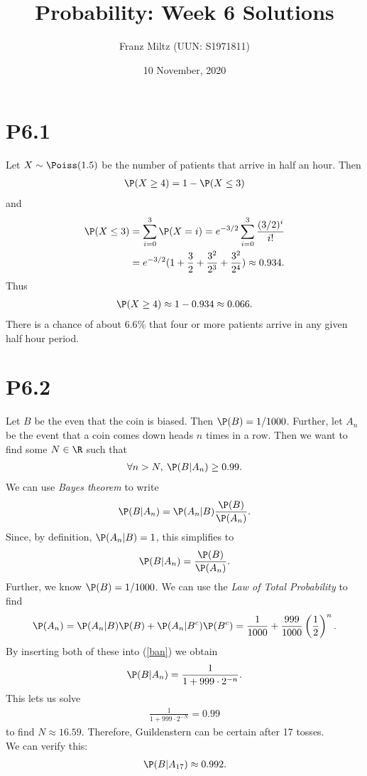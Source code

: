 \documentclass{article}
\begin{document}
\title{Probability: Week 6 Solutions}
\author{Franz Miltz (UUN: S1971811)}
\date{10 November, 2020}
\maketitle


\section*{P6.1}


Let $X\sim\Poiss(1.5)$ be the number of patients that arrive in half an hour. Then
\begin{align*}
  \P(X \geq 4) = 1 - \P(X \leq 3)
\end{align*}
and
\begin{align*}
  \P(X \leq 3) & = \sum_{i=0}^3 \P(X=i)=e^{-3/2}\sum_{i=0}^3 \frac{(3/2)^i}{i!} \\
               & =e^{-3/2} (1+\frac{3}{2}+\frac{3^2}{2^3}+\frac{3^2}{2^4})
  \approx 0.934.
\end{align*}
Thus
\begin{align*}
  \P(X\geq 4) \approx 1 - 0.934 \approx 0.066.
\end{align*}
There is a chance of about $6.6\%$ that four or more patients arrive in
any given half hour period.


\section*{P6.2}


Let $B$ be the even that the coin is biased. Then $\P(B)=1/1000$. Further,
let $A_n$ be the event that a coin comes down heads $n$ times in a row.
Then we want to find some $N\in\R$ such that
\begin{align*}
  \forall n > N,\: \P(B|A_n)\geq 0.99.
\end{align*}
We can use \emph{Bayes theorem} to write
\begin{align*}
  \P(B|A_n) = \P(A_n|B)\frac{\P(B)}{\P(A_n)}.
\end{align*}
Since, by definition, $\P(A_n|B)=1$, this simplifies to
\begin{align}
  \label{ban}
  \P(B|A_n) = \frac{\P(B)}{\P(A_n)}.
\end{align}
Further, we know $\P(B)=1/1000$. We can use the \emph{Law of Total
  Probability} to find
\begin{align*}
  \P(A_n)=\P(A_n|B)\P(B) + \P(A_n|B^c)\P(B^c)
  =\frac{1}{1000}+\frac{999}{1000}\left(\frac{1}{2}\right)^n.
\end{align*}
By inserting both of these into (\ref{ban}) we obtain
\begin{align*}
  \P(B|A_n) = \frac{1}{1+999\cdot 2^{-n}}.
\end{align*}
This lets us solve
\begin{align*}
  \frac{1}{1+999\cdot 2^{-N}} = 0.99
\end{align*}
to find $N\approx 16.59$. Therefore, Guildenstern can be certain after
17 tosses.\\
We can verify this:
\begin{align*}
  \P(B|A_{17}) \approx 0.992.
\end{align*}
\end{document}
